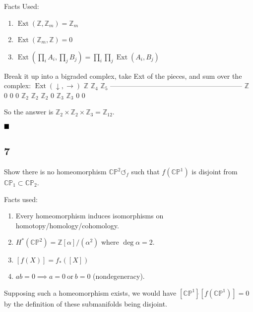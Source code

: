 Facts Used:

\begin{enumerate}
\def\labelenumi{\arabic{enumi}.}
\tightlist
\item
  \(\operatorname{Ext}({\mathbb{Z}}, {\mathbb{Z}}_m) = {\mathbb{Z}}_m\)
\item
  \(\operatorname{Ext}({\mathbb{Z}}_m, {\mathbb{Z}}) = 0\)
\item
  \(\operatorname{Ext}(\prod_i A_i, \prod_j B_j) = \prod_i \prod_j \operatorname{Ext}(A_i, B_j)\)
\end{enumerate}

Break it up into a bigraded complex, take Ext of the pieces, and sum
over the complex: \(\operatorname{Ext}(\downarrow, \rightarrow)\)
\textbar{} \({\mathbb{Z}}\) \textbar{} \({\mathbb{Z}}_4\) \textbar{}
\({\mathbb{Z}}_5\)
--------------------------------\textbar---------\textbar---------\textbar--------
\({\mathbb{Z}}\) \textbar{} 0 \textbar{} 0 \textbar{} 0
\({\mathbb{Z}}_2\) \textbar{} \({\mathbb{Z}}_2\) \textbar{}
\({\mathbb{Z}}_2\) \textbar{} 0 \({\mathbb{Z}}_3\) \textbar{}
\({\mathbb{Z}}_3\) \textbar{} 0 \textbar{} 0

So the answer is
\({\mathbb{Z}}_2 \times {\mathbb{Z}}_2 \times {\mathbb{Z}}_3 = {\mathbb{Z}}_{12}\).

\(\hfill\blacksquare\)

\hypertarget{section-11}{%
\subsection{7}\label{section-11}}

Show there is no homeomorphism \({\mathbb{CP}}^2{\circlearrowleft}_f\)
such that \(f({\mathbb{CP}}^1)\) is disjoint from
\({\mathbb{CP}}_1 \subset {\mathbb{CP}}_2\).

Facts used:

\begin{enumerate}
\def\labelenumi{\arabic{enumi}.}
\tightlist
\item
  Every homeomorphism induces isomorphisms on
  homotopy/homology/cohomology.
\item
  \(H^*({\mathbb{CP}}^2) = {\mathbb{Z}}[\alpha] / (\alpha^2)\) where
  \(\deg \alpha = 2\).
\item
  \([f(X)] = f_*([X])\)
\item
  \(a\dot{} b = 0 \implies a=0~\text{or}~b=0\) (nondegeneracy).
\end{enumerate}

Supposing such a homeomorphism exists, we would have
\([{\mathbb{CP}}^1] \dot{} [f({\mathbb{CP}}^1)] = 0\) by the definition
of these submanifolds being disjoint.

